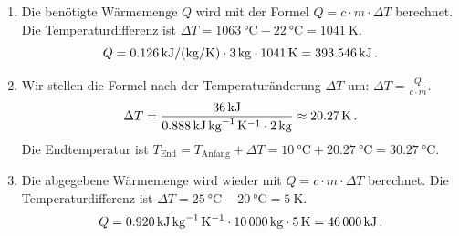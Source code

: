 \documentclass[ngerman]{scrreprt}
\newenvironment{loesungbox}[1]
  {\needspace{5\baselineskip}\begin{loesungboxstyle}[frametitle={#1}]}
  {\end{loesungboxstyle}}
\begin{document}
\begin{loesungbox}{Lösung zu \Cref{aufg:waermekapazitaet}}
\begin{enumerate}
    \item Die benötigte Wärmemenge $Q$ wird mit der Formel $Q = c \cdot m \cdot \Delta T$ berechnet. Die Temperaturdifferenz ist $\Delta T = \SI{1063}{\celsius} - \SI{22}{\celsius} = \SI{1041}{\kelvin}$.
    \begin{equation}
        Q = \SI{0.126}{\kilo\joule\per(\kilo\gram\per\kelvin)} \cdot \SI{3}{\kilo\gram} \cdot \SI{1041}{\kelvin} = \SI{393.546}{\kilo\joule} \,.
    \end{equation}
    
    \item Wir stellen die Formel nach der Temperaturänderung $\Delta T$ um: $\Delta T = \frac{Q}{c \cdot m}$.
    \begin{equation}
        \Delta T = \frac{\SI{36}{\kilo\joule}}{\SI{0.888}{\kilo\joule\per\kilo\gram\per\kelvin} \cdot \SI{2}{\kilo\gram}} \approx \SI{20.27}{\kelvin} \,.
    \end{equation}
    Die Endtemperatur ist $T_{\text{End}} = T_{\text{Anfang}} + \Delta T = \SI{10}{\celsius} + \SI{20.27}{\celsius} = \SI{30.27}{\celsius}$.
    
    \item Die abgegebene Wärmemenge wird wieder mit $Q = c \cdot m \cdot \Delta T$ berechnet. Die Temperaturdifferenz ist $\Delta T = \SI{25}{\celsius} - \SI{20}{\celsius} = \SI{5}{\kelvin}$.
    \begin{equation}
        Q = \SI{0.920}{\kilo\joule\per\kilo\gram\per\kelvin} \cdot \SI{10000}{\kilo\gram} \cdot \SI{5}{\kelvin} = \SI{46000}{\kilo\joule} \,.
    \end{equation}
\end{enumerate}
\end{loesungbox}
\end{document}
